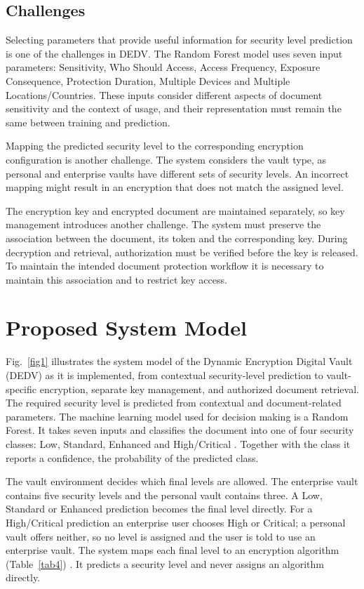 \documentclass[pdflatex,sn-mathphys-num]{sn-jnl}
\begin{document}
\subsection{Challenges}

Selecting parameters that provide useful information for security level prediction is one of the
challenges in DEDV. The Random Forest model uses seven input parameters: Sensitivity, Who Should
Access, Access Frequency, Exposure Consequence, Protection Duration, Multiple Devices and Multiple
Locations/Countries. These inputs consider different aspects of document sensitivity and the
context of usage, and their representation must remain the same between training and prediction.

Mapping the predicted security level to the corresponding encryption configuration is another
challenge. The system considers the vault type, as personal and enterprise vaults have different
sets of security levels. An incorrect mapping might result in an encryption that does not match
the assigned level.

The encryption key and encrypted document are maintained separately, so key management introduces
another challenge. The system must preserve the association between the document, its token and
the corresponding key. During decryption and retrieval, authorization must be verified before the
key is released. To maintain the intended document protection workflow it is necessary to
maintain this association and to restrict key access.

\section{Proposed System Model}\label{sec4}

Fig.~\ref{fig1} illustrates the system model of the Dynamic Encryption Digital Vault (DEDV) as it
is implemented, from contextual security-level prediction to vault-specific encryption, separate
key management, and authorized document retrieval. The required security level is predicted from
contextual and document-related parameters. The machine learning model used for decision making
is a Random Forest. It takes seven inputs and classifies the document into one of four security
classes: Low, Standard, Enhanced and High/Critical \cite{phoha2014context}. Together with the class
it reports a confidence, the probability of the predicted class.

The vault environment decides which final levels are allowed. The enterprise vault contains five
security levels and the personal vault contains three. A Low, Standard or Enhanced prediction
becomes the final level directly. For a High/Critical prediction an enterprise user chooses High
or Critical; a personal vault offers neither, so no level is assigned and the user is told to use
an enterprise vault. The system maps each final level to an encryption algorithm
(Table~\ref{tab4}) \cite{sasikumar2025enhancing}. It predicts a security level and never assigns
an algorithm directly.
\end{document}
